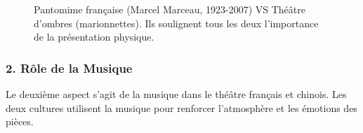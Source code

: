 \documentclass[UTF8,a4paper,12pt]{ctexart}
\numberwithin{equation}{section}
\begin{document}
\begin{figure}[h!]
\centering
{}%
\hspace*{0.5cm} %
\captionsetup{justification=centering, singlelinecheck=false}
\caption{Pantomime française (Marcel Marceau, 1923-2007) VS Théâtre d'ombres (marionnettes). Ils soulignent tous les deux l'importance de la présentation physique.}

\end{figure}

\subsubsection*{2. Rôle de la Musique}
Le deuxième aspect s'agit de la musique dans le théâtre français et chinois. Les deux cultures utilisent la musique pour renforcer l'atmosphère et les émotions des pièces.
\end{document}
